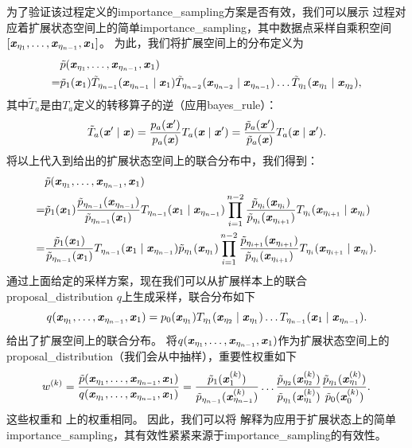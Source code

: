 为了验证该过程定义的\gls{importance_sampling}方案是否有效，我们可以展示\citep{Neal-2001}\,\,过程对应着扩展状态空间上的简单\gls{importance_sampling}，其中数据点采样自乘积空间$[\Vx_{\eta_1},\dots,\Vx_{\eta_{n-1}},\Vx_1]$。
为此，我们将扩展空间上的分布定义为
\begin{align}
&\tilde{p} (\Vx_{\eta_1}, \dots, \Vx_{\eta_{n-1}}, \Vx_1) \\
= &\tilde{p}_1 (\Vx_1) \tilde{T}_{\eta_{n-1}} (\Vx_{\eta_{n-1}} \mid \Vx_1)
 	\tilde{T}_{\eta_{n-2}}  (\Vx_{\eta_{n-2}} \mid \Vx_{\eta_{n-1}}) \dots
 	\tilde{T}_{\eta_1} (\Vx_{\eta_1} \mid \Vx_{\eta_2}) \label{eq:18.55} ,
\end{align}
其中$\tilde{T}_a$是由$T_a$定义的转移算子的逆（应用\gls{bayes_rule}）：
\begin{equation}
	\tilde{T}_a (\Vx' \mid \Vx) = \frac{p_a(\Vx')}{ p_a(\Vx) } T_a(\Vx \mid \Vx') = 
\frac{  \tilde{p}_a(\Vx')}{ \tilde{p}_a(\Vx) } T_a(\Vx \mid \Vx') .
\end{equation}
将以上代入到给出的扩展状态空间上的联合分布中，我们得到：
\begin{align}
	&\tilde{p} (\Vx_{\eta_1}, \dots, \Vx_{\eta_{n-1}}, \Vx_1) \\
	= &\tilde{p}_1 (\Vx_1) \frac{ \tilde{p}_{\eta_{n-1}} (\Vx_{\eta_{n-1}})  }{ \tilde{p}_{\eta_{n-1}}(\Vx_1)} T_{\eta_{n-1}} (\Vx_1 \mid \Vx_{\eta_{n-1}})
\prod_{i=1}^{n-2} \frac{ \tilde{p}_{\eta_i}(\Vx_{\eta_i}) }{ \tilde{p}_{\eta_i}(\Vx_{\eta_{i+1}})} T_{\eta_i} (\Vx_{\eta_{i+1}} \mid \Vx_{\eta_i}) \\
	= &\frac{ \tilde{p}_1(\Vx_1) }{ \tilde{p}_{\eta_{n-1}}(\Vx_1) } T_{\eta_{n-1}} (\Vx_1 \mid \Vx_{\eta_{n-1}})
\tilde{p}_{\eta_1} (\Vx_{\eta_1}) \prod_{i=1}^{n-2} \frac{ \tilde{p}_{\eta_{i+1}}(\Vx_{\eta_{i+1}}) }{ \tilde{p}_{\eta_i}(\Vx_{\eta_{i+1}}) } T_{\eta_i} (\Vx_{\eta_{i+1}} \mid \Vx_{\eta_i}) . \label{eq:18.59}
\end{align}
通过上面给定的采样方案，现在我们可以从扩展样本上的联合\gls{proposal_distribution} $q$上生成采样，联合分布如下
\begin{equation}
	q(\Vx_{\eta_1}, \dots, \Vx_{\eta_{n-1}}, \Vx_1)  = p_0(\Vx_{\eta_1}) T_{\eta_1}( \Vx_{\eta_2} \mid \Vx_{\eta_1} ) \dots T_{\eta_{n-1}} (\Vx_1 \mid \Vx_{\eta_{n-1}}) .
\end{equation}
给出了扩展空间上的联合分布。
将$q(\Vx_{\eta_1}, \dots, \Vx_{\eta_{n-1}}, \Vx_1)$作为扩展状态空间上的\gls{proposal_distribution}（我们会从中抽样），重要性权重如下
\begin{equation}
	w^{(k)} = \frac{ \tilde{p}(\Vx_{\eta_1}, \dots, \Vx_{\eta_{n-1}}, \Vx_1) }{ q( \Vx_{\eta_1}, \dots, \Vx_{\eta_{n-1}}, \Vx_1 ) } =
\frac{ \tilde{p}_1(\Vx_1^{(k)}) }{ \tilde{p}_{\eta_{n-1}}(\Vx_{\eta_{n-1}}^{(k)}) } \dots
\frac{ \tilde{p}_{\eta_{2}}(\Vx_{\eta_{2}}^{(k)}) }{ \tilde{p}_{\eta_1}(\Vx_{\eta_{1}}^{(k)}) } 
\frac{ \tilde{p}_{\eta_{1}}(\Vx_{\eta_{1}}^{(k)}) }{ \tilde{p}_{0}(\Vx_{0}^{(k)}) } .
\end{equation}
这些权重和\,\,上的权重相同。
因此，我们可以将\,\,解释为应用于扩展状态上的简单\gls{importance_sampling}，其有效性紧紧来源于\gls{importance_sampling}的有效性。

